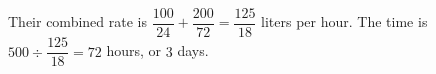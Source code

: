 Their combined rate is $\dfrac{100}{24}+\dfrac{200}{72}=\dfrac{125}{18}$ liters per hour. The time is $ 500\div\dfrac{125}{18}=72 $ hours, or $\boxed3 $ days.
